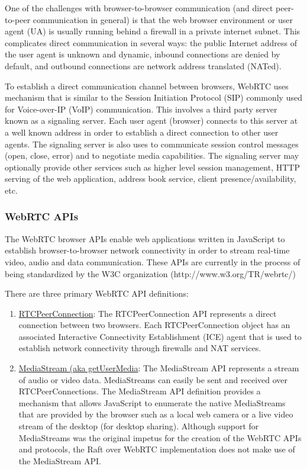 \documentclass[9pt]{extarticle}
\begin{document}
\begin{multicols}{2}
One of the challenges with browser-to-browser communication (and
direct peer-to-peer communication in general) is that the web browser
environment or user agent (UA) is usually running behind a firewall in
a private internet subnet. This complicates direct communication in
several ways: the public Internet address of the user agent is unknown
and dynamic, inbound connections are denied by default, and outbound
connections are network address translated (NATed).

To establish a direct communication channel between browsers, WebRTC
uses mechanism that is similar to the Session Initiation Protocol
(SIP) commonly used for Voice-over-IP (VoIP) communication. This
involves a third party server known as a signaling server. Each user
agent (browser) connects to this server at a well known address in
order to establish a direct connection to other user agents. The
signaling server is also uses to communicate session control messages
(open, close, error) and to negotiate media capabilities. The signaling
server may optionally provide other services such as higher level
session management, HTTP serving of the web application, address book
service, client presence/availability, etc.

\subsubsection{WebRTC APIs}

The WebRTC browser APIs enable web applications written in JavaScript
to establish browser-to-browser network connectivity in order to
stream real-time video, audio and data communication. These APIs are
currently in the process of being standardized by the W3C organization
(http://www.w3.org/TR/webrtc/) %

There are three primary WebRTC API definitions:

\begin{enumerate}
\item \href{http://www.w3.org/TR/webrtc/\#rtcpeerconnection-interface}{RTCPeerConnection}: The RTCPeerConnection API represents a direct connection between two browsers. Each RTCPeerConnection object has an associated Interactive Connectivity Establishment (ICE) agent that is used to establish network connectivity through firewalls and NAT services.

\item \href{http://www.w3.org/TR/webrtc/\#media-stream-api-extensions-for-network-use}{MediaStream (aka getUserMedia}: The MediaStream API represents a stream of audio or video data.  MediaStreams can easily be sent and received over RTCPeerConnections. The MediaStream API definition provides a mechanism that allows JavaScript to enumerate the native MediaStreams that are provided by the browser such as a local web camera or a live video stream of the desktop (for desktop sharing).  Although support for MediaStreams was the original impetus for the creation of the WebRTC APIs and protocols, the Raft over WebRTC implementation does not make use of the MediaStream API.


\end{enumerate}
\end{multicols}
\end{document}
